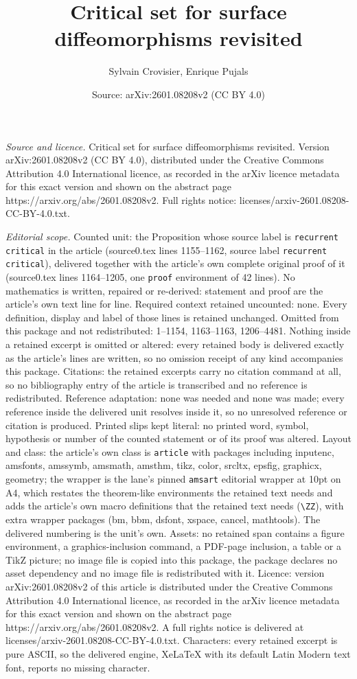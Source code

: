 \documentclass[10pt,a4paper]{amsart}
\title[Critical set for surface diffeomorphisms revisited]{Critical set for surface diffeomorphisms revisited}
\author{Sylvain Crovisier, Enrique Pujals}
\date{Source: arXiv:2601.08208v2 (CC BY 4.0)}
\begin{document}
\maketitle

\noindent\emph{Source and licence.} Critical set for surface diffeomorphisms revisited. Version arXiv:2601.08208v2 (CC BY 4.0), distributed under the Creative Commons Attribution 4.0 International licence, as recorded in the arXiv licence metadata for this exact version and shown on the abstract page https://arxiv.org/abs/2601.08208v2. Full rights notice: licenses/arxiv-2601.08208-CC-BY-4.0.txt.\par\smallskip

\noindent\textit{Editorial scope.} Counted unit: the Proposition whose source label is \texttt{recurrent critical} in the article (source0.tex lines 1155--1162, source label \texttt{recurrent critical}), delivered together with the article's own complete original proof of it (source0.tex lines 1164--1205, one \texttt{proof} environment of 42 lines). No mathematics is written, repaired or re-derived: statement and proof are the article's own text line for line. Required context retained uncounted: none. Every definition, display and label of those lines is retained unchanged. Omitted from this package and not redistributed: 1--1154, 1163--1163, 1206--4481. Nothing inside a retained excerpt is omitted or altered: every retained body is delivered exactly as the article's lines are written, so no omission receipt of any kind accompanies this package. Citations: the retained excerpts carry no citation command at all, so no bibliography entry of the article is transcribed and no reference is redistributed. Reference adaptation: none was needed and none was made; every reference inside the delivered unit resolves inside it, so no unresolved reference or citation is produced. Printed slips kept literal: no printed word, symbol, hypothesis or number of the counted statement or of its proof was altered. Layout and class: the article's own class is \texttt{article} with packages including inputenc, amsfonts, amssymb, amsmath, amsthm, tikz, color, srcltx, epsfig, graphicx, geometry; the wrapper is the lane's pinned \texttt{amsart} editorial wrapper at 10pt on A4, which restates the theorem-like environments the retained text needs and adds the article's own macro definitions that the retained text needs (\texttt{\textbackslash ZZ}), with extra wrapper packages (bm, bbm, dsfont, xspace, cancel, mathtools). The delivered numbering is the unit's own. Assets: no retained span contains a figure environment, a graphics-inclusion command, a PDF-page inclusion, a table or a TikZ picture; no image file is copied into this package, the package declares no asset dependency and no image file is redistributed with it. Licence: version arXiv:2601.08208v2 of this article is distributed under the Creative Commons Attribution 4.0 International licence, as recorded in the arXiv licence metadata for this exact version and shown on the abstract page https://arxiv.org/abs/2601.08208v2. A full rights notice is delivered at licenses/arxiv-2601.08208-CC-BY-4.0.txt. Characters: every retained excerpt is pure ASCII, so the delivered engine, XeLaTeX with its default Latin Modern text font, reports no missing character.
\end{document}
